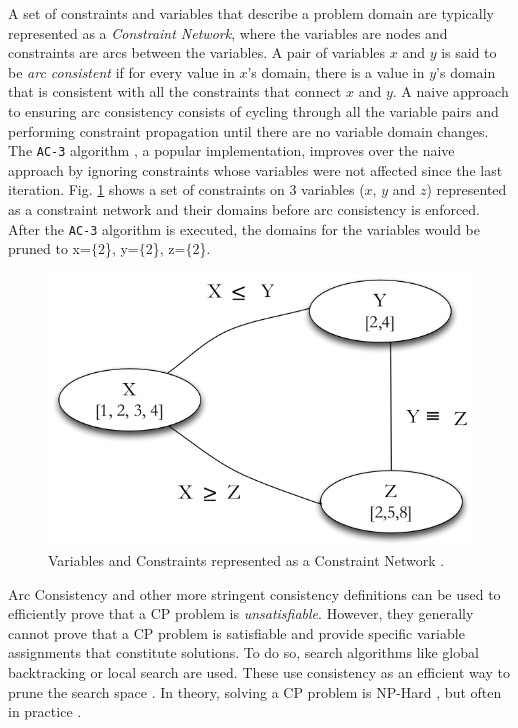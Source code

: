 {A set of constraints and variables that describe a problem domain are
typically represented as a \emph{Constraint Network}, where the
variables are nodes and constraints are arcs between the variables. A
pair of variables $x$ and $y$ is said to be \emph{arc consistent} if
for every value in $x$'s domain, there is a value in $y$'s domain that
is consistent with all the constraints that connect $x$ and $y$.  A
naive approach to ensuring arc consistency consists of cycling through
all the variable pairs and performing constraint propagation until
there are no variable domain changes. The \texttt{AC-3} algorithm
\cite{mackworth77}, a popular implementation, improves over the naive
approach by ignoring constraints whose variables were not affected
since the last iteration. Fig. \ref{fig:constraintnet} shows a set of
constraints on $3$ variables ($x$, $y$ and $z$) represented as a
constraint network and their domains before arc consistency is
enforced.  After the \texttt{AC-3} algorithm is executed, the domains
for the variables would be pruned to x=$\{2$\}, y=$\{2$\}, z=$\{2$\}.

\begin{figure}[!t]
\centering
\includegraphics[scale=1.9]{figs/constraint-net.jpeg}
\caption{\small Variables and Constraints represented as a Constraint
  Network .}
\label{fig:constraintnet}
\end{figure}

Arc Consistency and other more stringent consistency definitions can
be used to efficiently prove that a \textsf{CP} problem is
\emph{unsatisfiable}. However, they generally cannot prove that a
\textsf{CP} problem is satisfiable and provide specific variable
assignments that constitute solutions. To do so, search algorithms
like global backtracking \cite{hooker05} or local search are used.
These use consistency as an efficient way to prune the search space
\cite{cp06}. In theory, solving a \textsf{CP} problem is NP-Hard
\cite{ghallab04}, but often in practice .

}
